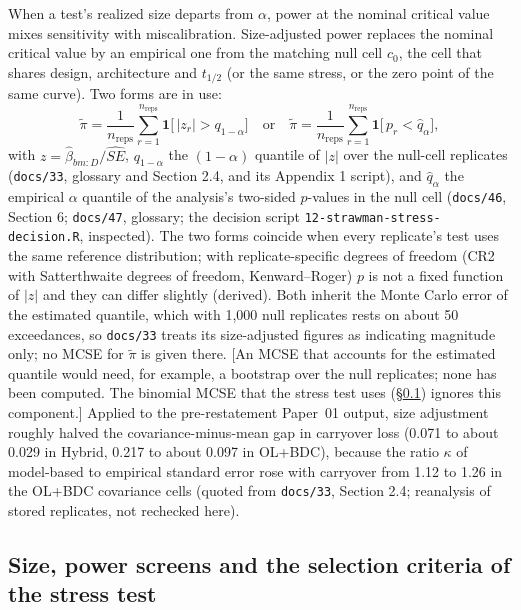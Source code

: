 \documentclass[11pt]{article}
\newcommand{\note}[1]{\textcolor{blue!60!black}{\small [#1]}}
\newcommand{\code}[1]{\texttt{#1}}
\begin{document}
When a test's realized size departs from $\alpha$, power at the nominal
critical value mixes sensitivity with miscalibration. Size-adjusted
power replaces the nominal critical value by an empirical one from the
matching null cell $c_0$, the cell that shares design, architecture and
$t_{1/2}$ (or the same stress, or the zero point of the same curve).
Two forms are in use:
\begin{equation}
\tilde\pi = \frac{1}{n_{\mathrm{reps}}}\sum_{r=1}^{n_{\mathrm{reps}}}
  \mathbf 1\bigl[\,|z_r| > q_{1-\alpha}\bigr]
\quad\text{or}\quad
\tilde\pi = \frac{1}{n_{\mathrm{reps}}}\sum_{r=1}^{n_{\mathrm{reps}}}
  \mathbf 1\bigl[\,p_r < \hat q_{\alpha}\bigr],
\label{eq:invc-size-adjusted}
\end{equation}
with $z = \hat\beta_{bm:D}/\widehat{SE}$, $q_{1-\alpha}$ the
$(1-\alpha)$ quantile of $|z|$ over the null-cell replicates
(\code{docs/33}, glossary and Section 2.4, and its Appendix 1 script),
and $\hat q_\alpha$ the empirical $\alpha$ quantile of the analysis's
two-sided $p$-values in the null cell (\code{docs/46}, Section 6;
\code{docs/47}, glossary; the decision script
\code{12-strawman-\allowbreak stress-\allowbreak decision.R},
inspected). The two forms coincide when every replicate's test uses the
same reference distribution; with replicate-specific degrees of freedom
(CR2 with Satterthwaite degrees of freedom, Kenward--Roger) $p$ is not a
fixed function of $|z|$ and they can differ slightly (derived). Both
inherit the Monte Carlo error of the estimated quantile, which with
1,000 null replicates rests on about 50 exceedances, so \code{docs/33}
treats its size-adjusted figures as indicating magnitude only; no MCSE
for $\tilde\pi$ is given there. \note{An MCSE that accounts for the
estimated quantile would need, for example, a bootstrap over the null
replicates; none has been computed. The binomial MCSE that the stress
test uses (\S\ref{sec:invd-criteria}) ignores this component.} Applied to the pre-restatement
Paper~01 output, size adjustment roughly halved the
covariance-minus-mean gap in carryover loss (0.071 to about 0.029 in
Hybrid, 0.217 to about 0.097 in OL+BDC), because the ratio $\kappa$ of
model-based to empirical standard error rose with carryover from 1.12
to 1.26 in the OL+BDC covariance cells (quoted from \code{docs/33},
Section 2.4; reanalysis of stored replicates, not rechecked here).

\subsection{Size, power screens and the selection criteria of the
stress test}
\label{sec:invd-criteria}
\end{document}
